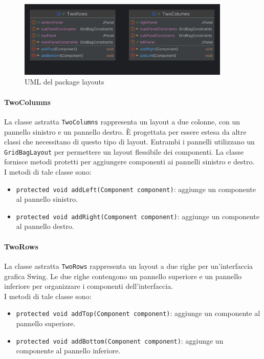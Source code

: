 \begin{figure}[H]
    \centering
    \includegraphics[width=0.9\textwidth]{img/layoutsPackage.png}
    \caption{UML del package layouts}
    \label{fig:UMLLayouts}
\end{figure}
\paragraph{TwoColumns}
La classe astratta \texttt{TwoColumns} rappresenta un layout a due colonne, con un pannello sinistro e un pannello destro. È progettata per essere estesa da altre classi che necessitano di questo tipo di layout.
Entrambi i pannelli utilizzano un \texttt{GridBagLayout} per permettere un layout flessibile dei componenti.
La classe fornisce metodi protetti per aggiungere componenti ai pannelli sinistro e destro.\\
I metodi di tale classe sono:
\begin{itemize}
    \item \texttt{protected void addLeft(Component component)}: aggiunge un componente al pannello sinistro.
    \item \texttt{protected void addRight(Component component)}: aggiunge un componente al pannello destro.
\end{itemize}

\paragraph{TwoRows}
La classe astratta \texttt{TwoRows} rappresenta un layout a due righe per un'interfaccia grafica Swing.
Le due righe contengono un pannello superiore e un pannello inferiore per organizzare i componenti dell'interfaccia.\\
I metodi di tale classe sono:
\begin{itemize}
    \item \texttt{protected void addTop(Component component)}: aggiunge un componente al pannello superiore.
    \item \texttt{protected void addBottom(Component component)}: aggiunge un componente al pannello inferiore.
\end{itemize}

